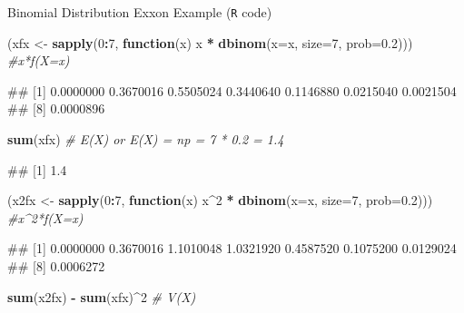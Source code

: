 \documentclass[12pt,ignorenonframetext,compress]{beamer}
\newenvironment{Shaded}{\begin{snugshade}}{\end{snugshade}}
\newcommand{\KeywordTok}[1]{\textcolor[rgb]{0.13,0.29,0.53}{\textbf{#1}}}
\newcommand{\DataTypeTok}[1]{\textcolor[rgb]{0.13,0.29,0.53}{#1}}
\newcommand{\DecValTok}[1]{\textcolor[rgb]{0.00,0.00,0.81}{#1}}
\newcommand{\FloatTok}[1]{\textcolor[rgb]{0.00,0.00,0.81}{#1}}
\newcommand{\StringTok}[1]{\textcolor[rgb]{0.31,0.60,0.02}{#1}}
\newcommand{\CommentTok}[1]{\textcolor[rgb]{0.56,0.35,0.01}{\textit{#1}}}
\newcommand{\ControlFlowTok}[1]{\textcolor[rgb]{0.13,0.29,0.53}{\textbf{#1}}}
\newcommand{\OperatorTok}[1]{\textcolor[rgb]{0.81,0.36,0.00}{\textbf{#1}}}
\newcommand{\NormalTok}[1]{#1}
\let\oldShaded\Shaded
\let\endoldShaded\endShaded
\renewenvironment{Shaded}{\scriptsize\oldShaded}{\endoldShaded}
\let\oldverbatim\verbatim
\let\endoldverbatim\endverbatim
\renewenvironment{verbatim}{\scriptsize\oldverbatim}{\endoldverbatim}
\begin{document}
\begin{frame}[fragile]{Binomial Distribution Exxon Example (\texttt{R}
code)}

\begin{Shaded}
\begin{Highlighting}[]
\NormalTok{(xfx <-}\StringTok{ }\KeywordTok{sapply}\NormalTok{(}\DecValTok{0}\OperatorTok{:}\DecValTok{7}\NormalTok{, }\ControlFlowTok{function}\NormalTok{(x) x }\OperatorTok{*}\StringTok{ }\KeywordTok{dbinom}\NormalTok{(}\DataTypeTok{x=}\NormalTok{x, }\DataTypeTok{size=}\DecValTok{7}\NormalTok{, }\DataTypeTok{prob=}\FloatTok{0.2}\NormalTok{))) }\CommentTok{#x*f(X=x) }
\end{Highlighting}
\end{Shaded}

\begin{verbatim}
## [1] 0.0000000 0.3670016 0.5505024 0.3440640 0.1146880 0.0215040 0.0021504
## [8] 0.0000896
\end{verbatim}

\begin{Shaded}
\begin{Highlighting}[]
\KeywordTok{sum}\NormalTok{(xfx) }\CommentTok{# E(X) or E(X) = np = 7 * 0.2 = 1.4}
\end{Highlighting}
\end{Shaded}

\begin{verbatim}
## [1] 1.4
\end{verbatim}

\begin{Shaded}
\begin{Highlighting}[]
\NormalTok{(x2fx <-}\StringTok{ }\KeywordTok{sapply}\NormalTok{(}\DecValTok{0}\OperatorTok{:}\DecValTok{7}\NormalTok{, }\ControlFlowTok{function}\NormalTok{(x) x}\OperatorTok{^}\DecValTok{2} \OperatorTok{*}\StringTok{ }\KeywordTok{dbinom}\NormalTok{(}\DataTypeTok{x=}\NormalTok{x, }\DataTypeTok{size=}\DecValTok{7}\NormalTok{, }\DataTypeTok{prob=}\FloatTok{0.2}\NormalTok{))) }\CommentTok{#x^2*f(X=x) }
\end{Highlighting}
\end{Shaded}

\begin{verbatim}
## [1] 0.0000000 0.3670016 1.1010048 1.0321920 0.4587520 0.1075200 0.0129024
## [8] 0.0006272
\end{verbatim}

\begin{Shaded}
\begin{Highlighting}[]
\KeywordTok{sum}\NormalTok{(x2fx) }\OperatorTok{-}\StringTok{ }\KeywordTok{sum}\NormalTok{(xfx)}\OperatorTok{^}\DecValTok{2} \CommentTok{# V(X)}
\end{Highlighting}
\end{Shaded}


\end{frame}
\end{document}
